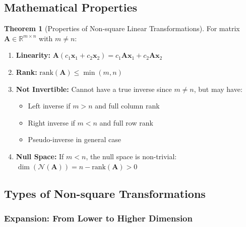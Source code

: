 \documentclass[12pt,a4paper]{article}
\theoremstyle{definition}
\newtheorem{theorem}{Theorem}[section]
\begin{document}
\subsection{Mathematical Properties}

\begin{theorem}[Properties of Non-square Linear Transformations]
For matrix $\mathbf{A} \in \mathbb{R}^{m \times n}$ with $m \neq n$:

\begin{enumerate}
    \item \textbf{Linearity:} $\mathbf{A}(c_1\mathbf{x}_1 + c_2\mathbf{x}_2) = c_1\mathbf{A}\mathbf{x}_1 + c_2\mathbf{A}\mathbf{x}_2$
    
    \item \textbf{Rank:} $\text{rank}(\mathbf{A}) \leq \min(m, n)$
    
    \item \textbf{Not Invertible:} Cannot have a true inverse since $m \neq n$, but may have:
    \begin{itemize}
        \item Left inverse if $m > n$ and full column rank
        \item Right inverse if $m < n$ and full row rank
        \item Pseudo-inverse in general case
    \end{itemize}
    
    \item \textbf{Null Space:} If $m < n$, the null space is non-trivial: $\dim(\mathcal{N}(\mathbf{A})) = n - \text{rank}(\mathbf{A}) > 0$
\end{enumerate}
\end{theorem}

\subsection{Types of Non-square Transformations}

\subsubsection{Expansion: From Lower to Higher Dimension}
\end{document}
